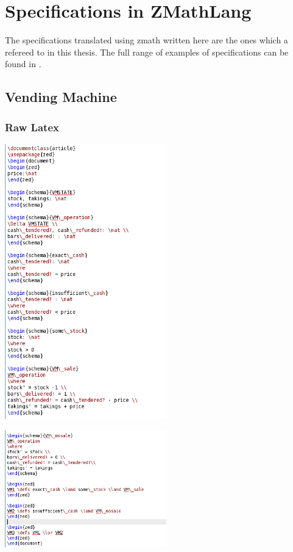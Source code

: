 \chapter{Specifications in ZMathLang}
\label{app:other}

The specifications translated using \gls{zmath} written here are the ones which a refereed to in this thesis. The full range of examples of specifications can be found in \cite{mathlangexamples}.

\section{Vending Machine}
\label{app:vm}

\begin{multicols}{2}
\subsection{Raw Latex}
\label{app:vm0}

\includegraphics[width=7cm]{examples/vm/0imagea.png}

\noindent \includegraphics[width=7cm]{examples/vm/0imageb.png}

\end{multicols}
